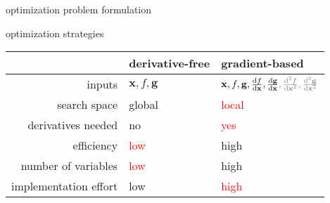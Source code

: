 \documentclass[aspectratio=169]{beamer}
\begin{document}
\begin{frame}{optimization problem formulation}
\end{frame}


\begin{frame}{optimization strategies}




\centering

\begin{table}
\begin{tabular}{r | p{2.5cm} | p{3.5cm}}
  &derivative-free & gradient-based \\
  \midrule
  inputs & $\mathbf{x}, f, \mathbf{g}$  &  $\mathbf{x}, f, \mathbf{g}, \frac{\text{d} f}{\text{d} \mathbf{x}}, \frac{\text{d} \mathbf{g}}{\text{d} \mathbf{x}}\color{gray},\frac{\text{d}^2 f}{\text{d} \mathbf{x}^2}, \frac{\text{d}^2 \mathbf{g}}{\text{d} \mathbf{x}^2}$\color{black} \\ 
  search space & global & \textcolor{red}{local} \\
  derivatives needed & no & \textcolor{red}{yes} \\
  efficiency & \textcolor{red}{low} & high \\
  number of variables & \textcolor{red}{low} & high \\
  implementation effort & low & \textcolor{red}{high}\\
\end{tabular}
\end{table}

\end{frame}
\end{document}
